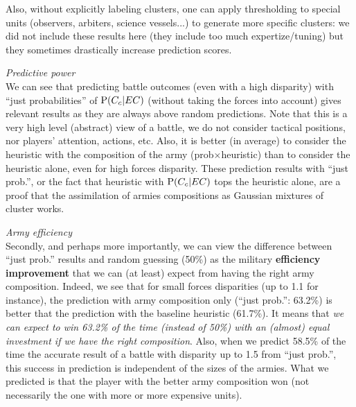 Also, without explicitly labeling clusters, one can apply thresholding to special units (observers, arbiters, science vessels...) to generate more specific clusters: we did not include these results here (they include too much expertize/tuning) but they sometimes drastically increase prediction scores. %

\vspace{0.2cm}
\textit{Predictive power}\\
We can see that predicting battle outcomes (even with a high disparity) with ``just probabilities'' of $\mathrm{P}(C_c|EC)$ (without taking the forces into account) gives relevant results as they are always above random predictions. Note that this is a very high level (abstract) view of a battle, we do not consider tactical positions, nor players' attention, actions, etc. Also, it is better (in average) to consider the heuristic with the composition of the army (prob$\times$heuristic) than to consider the heuristic alone, even for high forces disparity. These prediction results with ``just prob.'', or the fact that heuristic with $\mathrm{P}(C_c|EC)$ tops the heuristic alone, are a proof that the assimilation of armies compositions as Gaussian mixtures of cluster works.

\vspace{0.2cm}
\textit{Army efficiency}\\
Secondly, and perhaps more importantly, we can view the difference between ``just prob.'' results and random guessing (50\%) as the military \textbf{efficiency improvement} that we can (at least) expect from having the right army composition. 
Indeed, we see that for small forces disparities (up to 1.1 for instance), the prediction with army composition only (``just prob.'': 63.2\%) is better that the prediction with the baseline heuristic (61.7\%). It means that \textit{we can expect to win 63.2\% of the time (instead of 50\%) with an (almost) equal investment if we have the right composition}. %
Also, when we predict 58.5\% of the time the accurate result of a battle with disparity up to 1.5 from ``just prob.'', this success in prediction is independent of the sizes of the armies. What we predicted is that the player with the better army composition won (not necessarily the one with more or more expensive units). 


